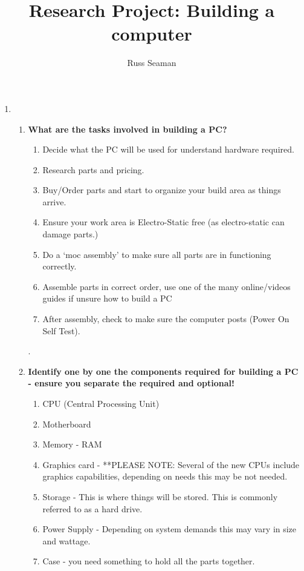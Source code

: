 \documentclass[]{article}
\title{Research Project: Building a computer}
\author{Russ Seaman}
\begin{document}
	
	\maketitle
	
	\begin{enumerate}
		\item
		
		\begin{enumerate}
			\item \textbf{What are the tasks involved in building a PC?}
			\smallskip
			\\ \begin{enumerate}
				\item Decide what the PC will be used for understand hardware required.
				\item Research parts and pricing.
				\item Buy/Order parts and start to organize your build area as things arrive.
				\item Ensure your work area is Electro-Static free (as electro-static can damage parts.)
				\item Do a `moc assembly' to make sure all parts are in functioning correctly.
				\item Assemble parts in correct order, use one of the many online/videos guides if unsure how to build a PC
				\item After assembly, check to make sure the computer posts (Power On Self Test).
				
			\end{enumerate}.
			\medskip
			\item \textbf{Identify one by one the components required for building a PC - ensure you separate the required and optional!}
			\smallskip
			\begin{enumerate}
				\item CPU (Central Processing Unit)
				\item Motherboard
				\item Memory - RAM
				\item Graphics card - **PLEASE NOTE: Several of the new CPUs include graphics capabilities, depending on needs this may be not needed.
				\item Storage - This is where things will be stored.  This is commonly referred to as a hard drive.
				\item Power Supply - Depending on system demands this may vary in size and wattage.
				\item Case - you need something to hold all the parts together.
			\end{enumerate}
			\medskip
			

\end{enumerate}
\end{enumerate}
\end{document}

